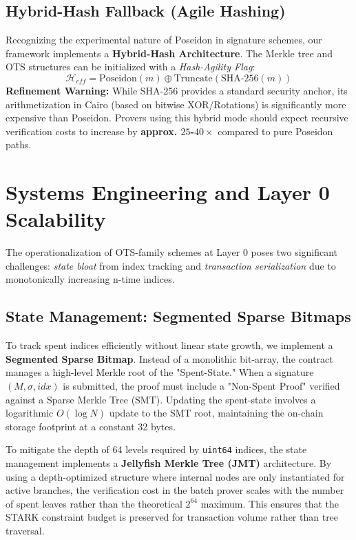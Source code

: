 \documentclass[conference]{IEEEtran}
\theoremstyle{definition}
\theoremstyle{plain}
\theoremstyle{remark}
\newcommand{\Hash}{\mathcal{H}}
\begin{document}
\subsection{Hybrid-Hash Fallback (Agile Hashing)}
Recognizing the experimental nature of Poseidon in signature schemes, our framework implements a \textbf{Hybrid-Hash Architecture}. The Merkle tree and OTS structures can be initialized with a \emph{Hash-Agility Flag}:
\[ \Hash_{eff} = \text{Poseidon}(m) \oplus \text{Truncate}(\text{SHA-256}(m)) \]
\textbf{Refinement Warning:} While SHA-256 provides a standard security anchor, its arithmetization in Cairo (based on bitwise XOR/Rotations) is significantly more expensive than Poseidon. Provers using this hybrid mode should expect recursive verification costs to increase by \textbf{approx. $25$-$40\times$} compared to pure Poseidon paths. 

\section{Systems Engineering and Layer 0 Scalability}
The operationalization of OTS-family schemes at Layer 0 poses two significant challenges: \emph{state bloat} from index tracking and \emph{transaction serialization} due to monotonically increasing n-time indices.

\subsection{State Management: Segmented Sparse Bitmaps}
To track spent indices efficiently without linear state growth, we implement a \textbf{Segmented Sparse Bitmap}. Instead of a monolithic bit-array, the contract manages a high-level Merkle root of the "Spent-State." When a signature $(M, \sigma, idx)$ is submitted, the proof must include a "Non-Spent Proof" verified against a Sparse Merkle Tree (SMT). Updating the spent-state involves a logarithmic $O(\log N)$ update to the SMT root, maintaining the on-chain storage footprint at a constant 32 bytes. 

To mitigate the depth of 64 levels required by \texttt{uint64} indices, the state management implements a \textbf{Jellyfish Merkle Tree (JMT)} architecture. By using a depth-optimized structure where internal nodes are only instantiated for active branches, the verification cost in the batch prover scales with the number of spent leaves rather than the theoretical $2^{64}$ maximum. This ensures that the STARK constraint budget is preserved for transaction volume rather than tree traversal.
\end{document}
